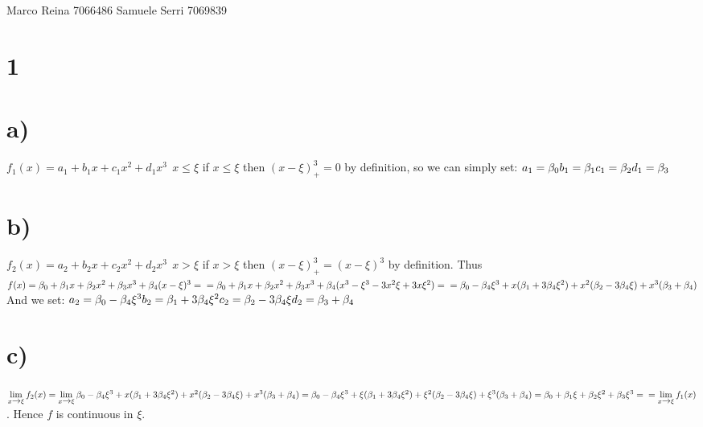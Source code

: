 \documentclass[12pt]{article}
\begin{document}
\section*{}
Marco Reina 7066486 \newline
Samuele Serri 7069839 \newline
\section*{1}
\section*{a)}
$f_1(x) = a_1 + b_1x + c_1x^2 + d_1x^3 \  \ x\leq\xi$ \newline
if $x \leq \xi$ then $(x - \xi)_{+}^3 = 0$ by definition, so we can simply set: \newline
$a_1  = \beta_0 \\ b_1 = \beta_1 \\ c_1 = \beta_2 \\ d_1 = \beta_3$
\section*{b)}
$f_2(x) = a_2 + b_2x + c_2x^2 + d_2x^3 \ \ x>\xi$ \newline
if $x > \xi$ then $(x - \xi)^3_+ = ( x - \xi)^3$ by definition. \newline
Thus $f(x) = \beta_0 + \beta_1x + \beta_2x^2+\beta_3 x^3 + \beta_4(x - \xi)^3 = \\
= \beta_0 + \beta_1x + \beta_2x^2 + \beta_3x^3 + \beta_4(x^3 - \xi^3 -3x^2\xi + 3x\xi^2) = \\
= \beta_0 - \beta_4\xi^3 + x(\beta_1 + 3\beta_4\xi^2) + x^2(\beta_2 - 3\beta_4\xi) + x^3(\beta_3 + \beta_4) \\$
And we set: \newline
$a_2 = \beta_0 - \beta_4\xi^3 \\ b_2 = \beta_1 + 3\beta_4\xi^2 \\ c_2 = \beta_2 - 3\beta_4\xi \\ d_2 = \beta_3 + \beta_4$
\section*{c)}
$\lim\limits_{x\xrightarrow{}\xi}f_2(x) = \lim\limits_{x\xrightarrow{}\xi}\beta_0 - \beta_4\xi^3 + x(\beta_1 + 3\beta_4\xi^2) + x^2(\beta_2 - 3\beta_4\xi) + x^3(\beta_3 + \beta_4) = \beta_0 - \beta_4\xi^3 + \xi(\beta_1 + 3\beta_4\xi^2) + \xi^2(\beta_2 - 3\beta_4\xi)  + \xi^3(\beta_3 + \beta_4) = \beta_0 + \beta_1\xi + \beta_2\xi^2 + \beta_3\xi^3 = \\ = \lim\limits_{x\xrightarrow{}\xi}f_1(x)$. \newline
Hence $f$ is continuous in $\xi$.
\end{document}
